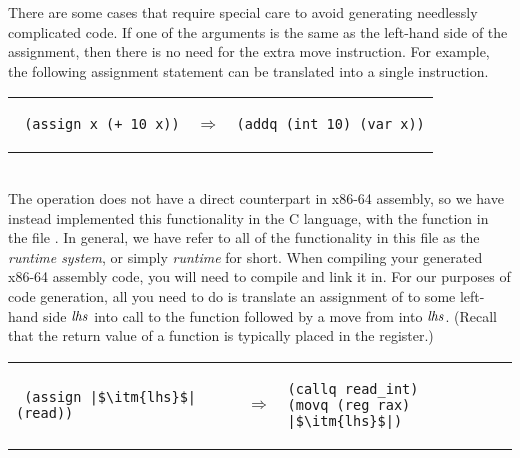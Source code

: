 \documentclass[11pt]{book}
\begin{document}
There are some cases that require special care to avoid generating
needlessly complicated code. If one of the arguments is the same as
the left-hand side of the assignment, then there is no need for the
extra move instruction.  For example, the following assignment
statement can be translated into a single  instruction.\\
\begin{tabular}{lll}
\begin{minipage}{0.4\textwidth}
\begin{lstlisting}
 (assign x (+ 10 x))
\end{lstlisting}
\end{minipage}
&
$\Rightarrow$
&
\begin{minipage}{0.4\textwidth}
\begin{lstlisting}
(addq (int 10) (var x))
\end{lstlisting}
\end{minipage}
\end{tabular} \\

The  operation does not have a direct counterpart in x86-64
assembly, so we have instead implemented this functionality in the C
language, with the function  in the file
. In general, we have refer to all of the
functionality in this file as the \emph{runtime system}, or simply
\emph{runtime} for short. When compiling your generated x86-64
assembly code, you will need to compile  and link it
in. For our purposes of code generation, all you need to do is
translate an assignment of  to some left-hand side
$\mathit{lhs}$ into call to the  function followed by a
move from  into $\mathit{lhs}$. (Recall that the return value
of a function is typically placed in the  register.)  \\
\begin{tabular}{lll}
\begin{minipage}{0.4\textwidth}
\begin{lstlisting}
 (assign |$\itm{lhs}$| (read))
\end{lstlisting}
\end{minipage}
&
$\Rightarrow$
&
\begin{minipage}{0.4\textwidth}
\begin{lstlisting}
(callq read_int)
(movq (reg rax) |$\itm{lhs}$|)
\end{lstlisting}
\end{minipage}
\end{tabular} \\
\end{document}
